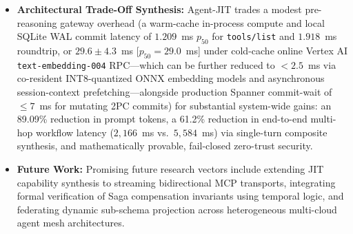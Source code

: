 \documentclass[conference,10pt]{IEEEtran}
\begin{document}
\begin{itemize}
$\Sigma_{\text{inv}}^{(k)} = \operatorname{SHA-256}(\Sigma_{\text{proj}}^{(i)} \parallel \Sigma_{\text{auth}} \parallel \text{ToolID}_{\text{inv}}^{(i)} \parallel \mathcal{H}_{\text{ast}}^{\text{exec}} \parallel h_{\text{args}}^{(i)} \parallel t_{\text{exec}}^{(k)})$, linking into the turn-$k$ terminal hash $\mathcal{C}_{k,\text{term}}^{(\tau,s)}$.
    \item \textbf{Architectural Trade-Off Synthesis:} Agent-JIT trades a modest pre-reasoning gateway overhead (a warm-cache in-process compute and local SQLite WAL commit latency of $1.209$~ms $p_{50}$ for \texttt{tools/list} and $1.918$~ms roundtrip, or $29.6 \pm 4.3$~ms [$p_{50} = 29.0$~ms] under cold-cache online Vertex AI \texttt{text-embedding-004} RPC—which can be further reduced to $<2.5$~ms via co-resident INT8-quantized ONNX embedding models and asynchronous session-context prefetching—alongside production Spanner commit-wait of $\le 7$~ms for mutating 2PC commits) for substantial system-wide gains: an 89.09\% reduction in prompt tokens, a 61.2\% reduction in end-to-end multi-hop workflow latency ($2{,}166$~ms vs.\ $5{,}584$~ms) via single-turn composite synthesis, and mathematically provable, fail-closed zero-trust security.
    \item \textbf{Future Work:} Promising future research vectors include extending JIT capability synthesis to streaming bidirectional MCP transports, integrating formal verification of Saga compensation invariants using temporal logic, and federating dynamic sub-schema projection across heterogeneous multi-cloud agent mesh architectures.
\end{itemize}
\end{document}
